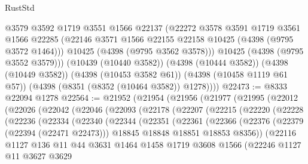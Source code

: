 \begin{lexlean}{RustStd}
\begin{coremodule}
          @3579
          @3592
          @1719
          @3551
          @1566
          @22137
          (@22272
            @3578
            @3591
            @1719
            @3561
            @1566
            @22285
            (@22146 @3571 @1566 @22155 @22158 @10425 (@4398 (@9795 @3572 @1464)))
            @10425
            (@4398 (@9795 @3562 @3578)))
          @10425
          (@4398 (@9795 @3552 @3579)))
        (@10439 (@10440 @3582))
        (@4398 (@10444 @3582))
        (@4398 (@10449 @3582))
        (@4398 (@10453 @3582 @61))
        (@4398 (@10458 @1119 @61 @57))
        (@4398 (@8351 (@8352 (@10464 @3582)) @1278))))
@22473 := @8333 @22094 @1278
@22564 := @21952
    (@21954
      (@21956
        (@21977
          (@21995
            (@22012
              (@22026
                (@22042
                  (@22046
                    (@22093
                      (@22178
                        (@22207
                          (@22215
                            (@22220
                              (@22228
                                (@22236
                                  (@22334
                                    (@22340
                                      (@22344
                                        (@22351
                                          (@22361
                                            (@22366
                                              (@22376
                                                (@22379 (@22394 (@22471 @22473)))
                                                @18845
                                                @18848
                                                @18851
                                                @18853
                                                @8356))
                                            (@22116
                                              @1127
                                              @136
                                              @11
                                              @44
                                              @3631
                                              @1464
                                              @1458
                                              @1719
                                              @3608
                                              @1566
                                              (@22246
                                                @1127
                                                @11
                                                @3627
                                                @3629

\end{coremodule}
\end{lexlean}
